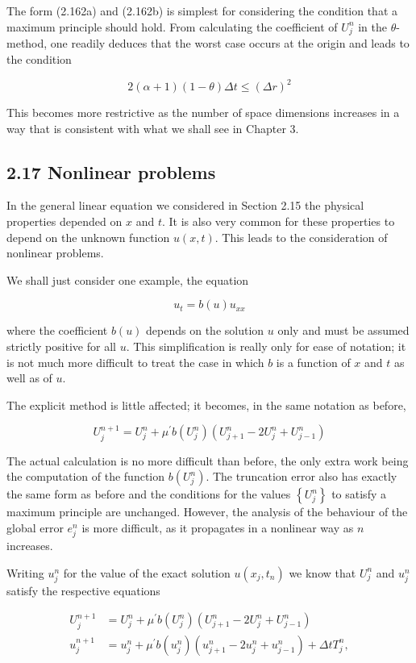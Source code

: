 \documentclass[10pt]{article}
\begin{document}
The form (2.162a) and (2.162b) is simplest for considering the condition that a maximum principle should hold. From calculating the coefficient of \(U_{j}^{n}\) in the \(\theta\)-method, one readily deduces that the worst case occurs at the origin and leads to the condition

\[
2(\alpha+1)(1-\theta) \Delta t \leq(\Delta r)^{2}
\]

This becomes more restrictive as the number of space dimensions increases in a way that is consistent with what we shall see in Chapter 3.

\subsection*{2.17 Nonlinear problems}
In the general linear equation we considered in Section 2.15 the physical properties depended on \(x\) and \(t\). It is also very common for these properties to depend on the unknown function \(u(x, t)\). This leads to the consideration of nonlinear problems.

We shall just consider one example, the equation

\[
u_{t}=b(u) u_{x x}
\]

where the coefficient \(b(u)\) depends on the solution \(u\) only and must be assumed strictly positive for all \(u\). This simplification is really only for ease of notation; it is not much more difficult to treat the case in which \(b\) is a function of \(x\) and \(t\) as well as of \(u\).

The explicit method is little affected; it becomes, in the same notation as before,

\[
U_{j}^{n+1}=U_{j}^{n}+\mu^{\prime} b\left(U_{j}^{n}\right)\left(U_{j+1}^{n}-2 U_{j}^{n}+U_{j-1}^{n}\right)
\]

The actual calculation is no more difficult than before, the only extra work being the computation of the function \(b\left(U_{j}^{n}\right)\). The truncation error also has exactly the same form as before and the conditions for the values \(\left\{U_{j}^{n}\right\}\) to satisfy a maximum principle are unchanged. However, the analysis of the behaviour of the global error \(e_{j}^{n}\) is more difficult, as it propagates in a nonlinear way as \(n\) increases.

Writing \(u_{j}^{n}\) for the value of the exact solution \(u\left(x_{j}, t_{n}\right)\) we know that \(U_{j}^{n}\) and \(u_{j}^{n}\) satisfy the respective equations

\[
\begin{aligned}
U_{j}^{n+1} & =U_{j}^{n}+\mu^{\prime} b\left(U_{j}^{n}\right)\left(U_{j+1}^{n}-2 U_{j}^{n}+U_{j-1}^{n}\right) \\
u_{j}^{n+1} & =u_{j}^{n}+\mu^{\prime} b\left(u_{j}^{n}\right)\left(u_{j+1}^{n}-2 u_{j}^{n}+u_{j-1}^{n}\right)+\Delta t T_{j}^{n},
\end{aligned}
\]
\end{document}
